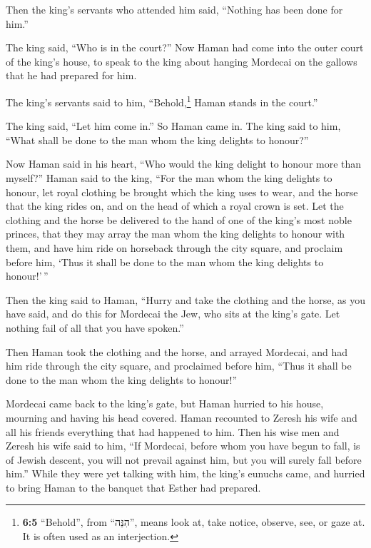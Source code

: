 Then the king's servants who attended him said, ``Nothing has been done
for him.''

 The king said, ``Who is in the court?'' Now Haman had
come into the outer court of the king's house, to speak to the king
about hanging Mordecai on the gallows that he had prepared for him.

 The king's servants said to him, ``Behold,\footnote{\textbf{6:5}
  ``Behold'', from ``הִנֵּה'', means look at, take notice, observe, see,
  or gaze at. It is often used as an interjection.} Haman stands in the
court.''

The king said, ``Let him come in.''  So Haman came in. The
king said to him, ``What shall be done to the man whom the king delights
to honour?''

Now Haman said in his heart, ``Who would the king delight to honour more
than myself?''  Haman said to the king, ``For the man whom
the king delights to honour,  let royal clothing be
brought which the king uses to wear, and the horse that the king rides
on, and on the head of which a royal crown is set.  Let
the clothing and the horse be delivered to the hand of one of the king's
most noble princes, that they may array the man whom the king delights
to honour with them, and have him ride on horseback through the city
square, and proclaim before him, `Thus it shall be done to the man whom
the king delights to honour!'\,''

 Then the king said to Haman, ``Hurry and take the
clothing and the horse, as you have said, and do this for Mordecai the
Jew, who sits at the king's gate. Let nothing fail of all that you have
spoken.''

 Then Haman took the clothing and the horse, and arrayed
Mordecai, and had him ride through the city square, and proclaimed
before him, ``Thus it shall be done to the man whom the king delights to
honour!''

 Mordecai came back to the king's gate, but Haman hurried
to his house, mourning and having his head covered. 
Haman recounted to Zeresh his wife and all his friends everything that
had happened to him. Then his wise men and Zeresh his wife said to him,
``If Mordecai, before whom you have begun to fall, is of Jewish descent,
you will not prevail against him, but you will surely fall before him.''
 While they were yet talking with him, the king's eunuchs
came, and hurried to bring Haman to the banquet that Esther had
prepared.

